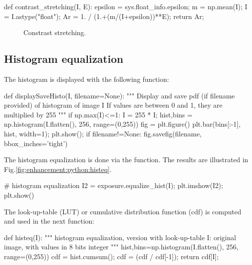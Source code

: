 \begin{python}
def contrast_stretching(I, E):
    epsilon = sys.float_info.epsilon;
    m = np.mean(I);
    I = I.astype("float");
    Ar = 1. / (1.+(m/(I+epsilon))**E);
    return Ar;
\end{python}


\begin{figure}[htbp]
 \centering\caption{Constrast stretching.}%
  \hfill
 
  \hfill
 \vspace*{-5pt}%
 \label{fig:enhancement:python:stretching}%
\end{figure}
 \vspace*{-6mm}
\subsection{Histogram equalization}
The histogram is displayed with the following function:
\begin{python}
def displaySaveHisto(I, filename=None):
    """
    Display and save pdf (if filename provided) of histogram of image I
    If values are between 0 and 1, they are multiplied by 255
    """
    if np.max(I)<=1:
        I = 255 * I;
    hist,bins = np.histogram(I.flatten(), 256, range=(0,255))
    fig = plt.figure()
    plt.bar(bins[:-1], hist, width=1);
    plt.show();
    if filename!=None:
        fig.savefig(filename, bbox_inches='tight')
\end{python}

The histogram equalization is done via the  function. The results are illustrated in Fig.\ref{fig:enhancement:python:histeq}.

\begin{python}
# histogram equalization
I2 = exposure.equalize_hist(I);
plt.imshow(I2);
plt.show()
\end{python}

The look-up-table (LUT) or cumulative distribution function (cdf) is computed and used in the next function:
\begin{python}
def histeq(I):
    """
    histogram equalization, version with look-up-table
    I: original image, with values in 8 bits integer
    """
    hist,bins=np.histogram(I.flatten(), 256, range=(0,255))
    cdf = hist.cumsum();
    cdf = (cdf / cdf[-1]);
    return cdf[I];
\end{python}

